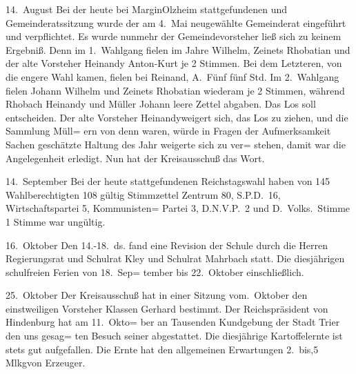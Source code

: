 

14.\ August   Bei der heute bei Margin\unsicher Olzheim stattgefundenen\ob
und Gemeinderatssitzung wurde der am 4.\ Mai\ob
neugewählte Gemeinderat eingeführt und verpflichtet.\ob
Es wurde nunmehr der Gemeindevorsteher ließ sich\ob
zu keinem Ergebniß. Denn im 1.\ Wahlgang fielen\ob
im Jahre Wilhelm, Zeinets Rhobatian und der\ob
alte Vorsteher Heinandy Anton-Kurt je 2 Stimmen.\ob
Bei dem Letzteren, von die engere Wahl kamen,\ob
fielen bei Reinand, A.\ Fünf fünf Std. Im 2.\ Wahlgang\ob
fielen Johann Wilhelm und Zeinets Rhobatian\ob
wiederam je 2 Stimmen, während Rhobach Heinandy\ob
und Müller Johann leere Zettel abgaben. Das Los\ob
soll entscheiden. Der alte Vorsteher Heinandy\unsicher weigert\ob
sich, das Los zu ziehen, und die Sammlung Müll=\ob
ern von denn waren, würde in Fragen der Aufmerksamkeit\unsicher\ob
Sachen geschätzte Haltung des Jahr weigerte sich zu ver=\ob
stehen, damit war die Angelegenheit erledigt.\ob
Nun hat der Kreisausschuß das Wort.

14.\ September Bei der heute stattgefundenen Reichstagswahl haben\ob
von 145 Wahlberechtigten 108 gültig Stimmzettel\ob
Zentrum 80, S.P.D.\ 16, Wirtschaftspartei 5, Kommunisten=\ob
Partei 3, D.N.V.P.\ 2 und D.\ Volks.\ Stimme 1 Stimme\ob
war ungültig.

16.\ Oktober  Den 14.-18.\ ds. fand eine Revision der Schule\ob
durch die Herren Regierungsrat und Schulrat Kley\ob
und Schulrat Mahrbach statt.\ob
Die diesjährigen schulfreien Ferien von 18.\ Sep=\ob
tember bis 22.\ Oktober einschließlich.

25.\ Oktober  Der Kreisausschuß hat in einer Sitzung vom.\ Oktober den einstweiligen Vorsteher Klassen\ob
Gerhard bestimmt.\ob
Der Reichspräsident von Hindenburg hat am 11.\ Okto=\ob
ber an Tausenden Kundgebung der Stadt Trier den uns gesag=\ob
ten Besuch seiner abgestattet.\ob
Die diesjährige Kartoffelernte ist stets gut aufgefallen.\ob
Die Ernte hat den allgemeinen Erwartungen 2.\ bis,5 Mlkg\unsicher von Erzeuger.
\pend
